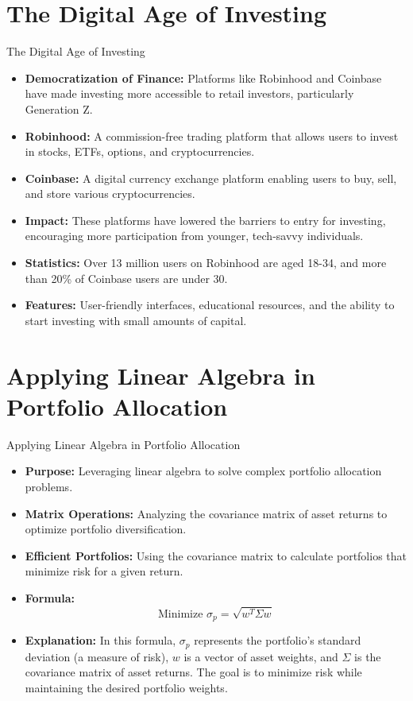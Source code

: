 \documentclass{beamer}
\begin{document}
\section{The Digital Age of Investing}
\begin{frame}{The Digital Age of Investing}
    \begin{itemize}
        \item \textbf{Democratization of Finance:} Platforms like Robinhood and Coinbase have made investing more accessible to retail investors, particularly Generation Z.
        \item \textbf{Robinhood:} A commission-free trading platform that allows users to invest in stocks, ETFs, options, and cryptocurrencies.
        \item \textbf{Coinbase:} A digital currency exchange platform enabling users to buy, sell, and store various cryptocurrencies.
        \item \textbf{Impact:} These platforms have lowered the barriers to entry for investing, encouraging more participation from younger, tech-savvy individuals.
        \item \textbf{Statistics:} Over 13 million users on Robinhood are aged 18-34, and more than 20\% of Coinbase users are under 30.
        \item \textbf{Features:} User-friendly interfaces, educational resources, and the ability to start investing with small amounts of capital.
    \end{itemize}
\end{frame}

\section{Applying Linear Algebra in Portfolio Allocation}
\begin{frame}{Applying Linear Algebra in Portfolio Allocation}
    \begin{itemize}
        \item \textbf{Purpose:} Leveraging linear algebra to solve complex portfolio allocation problems.
        \item \textbf{Matrix Operations:} Analyzing the covariance matrix of asset returns to optimize portfolio diversification.
        \item \textbf{Efficient Portfolios:} Using the covariance matrix to calculate portfolios that minimize risk for a given return.
        \item \textbf{Formula:}
        \begin{equation*}
            \text{Minimize } \sigma_p = \sqrt{w^T \Sigma w}
        \end{equation*}
        \item \textbf{Explanation:} In this formula, \( \sigma_p \) represents the portfolio's standard deviation (a measure of risk), \( w \) is a vector of asset weights, and \( \Sigma \) is the covariance matrix of asset returns. The goal is to minimize risk while maintaining the desired portfolio weights.
    \end{itemize}
\end{frame}
\end{document}
